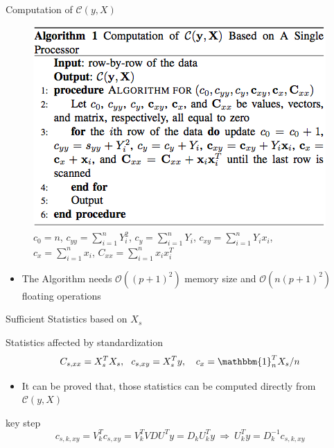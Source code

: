 \documentclass[ignorenonframetext,]{beamer}
\providecommand{\tightlist}{%
  \setlength{\itemsep}{0pt}\setlength{\parskip}{0pt}}
\begin{document}
\begin{frame}{Computation of \(\mathcal{C}(y, X)\)}

\begin{figure}

{\centering \includegraphics[width=0.6\linewidth]{./Alg_1} 

}

\caption{$c_{0} = n$, $c_{yy} = \sum_{i=1}^n Y_i^2$, $c_y = \sum_{i=1}^n Y_i$, $c_{xy} =\sum_{i=1}^n Y_ix_i$,$c_x = \sum_{i=1}^n x_i$, $C_{xx} = \sum_{i=1}^n x_ix_i^T$}\label{fig:unnamed-chunk-1}
\end{figure}

\begin{itemize}
\tightlist
\item
  The Algorithm needs \(\mathcal{O}((p+1)^2)\) memory size and
  \(\mathcal{O}(n(p+1)^2)\) floating operations
\end{itemize}

\end{frame}

\begin{frame}{Sufficient Statistics based on \(X_s\)}

\begin{block}{Statistics affected by standardization}
\[
  C_{s, xx} = X^T_{s}X_{s},~~ c_{s,xy} = X_s^Ty, ~~~c_x = \mathbbm{1}_{n}^TX_s/n
\]
\end{block}

\begin{itemize}
\tightlist
\item
  It can be proved that, those statistics can be computed directly from
  \(\mathcal{C}(y, X)\)
\end{itemize}

\begin{block}{key step}
\[
c_{s,k,xy} = V_k^Tc_{s,xy} = V_k^TVDU^Ty= D_kU_k^Ty ~\Rightarrow ~U_k^Ty = D^{-1}_kc_{s,k,xy}    
\]
\end{block}

\end{frame}
\end{document}
